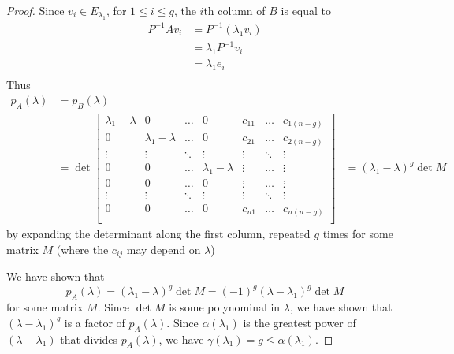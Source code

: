\documentclass{article}
\begin{document}
\begin{proof}
  Since $v_i \in E_{\lambda_1}$, for $1 \leq i \leq g$, the $i$th column of $B$ is equal to
  \begin{align*}
    P^{-1}Av_i & = P^{-1}(\lambda_1v_i) \\
               & = \lambda_1P^{-1}v_i   \\
               & = \lambda_1e_i         \\
  \end{align*}
  Thus
  \begin{align*}
    p_A(\lambda) & = p_B(\lambda)                   \\
                 & = \det
    \begin{bmatrix}
      \lambda_1 - \lambda & 0                   & \dots  & 0                   & c_{11} & \dots  & c_{1(n-g)} \\
      0                   & \lambda_1 - \lambda & \dots  & 0                   & c_{21} & \dots  & c_{2(n-g)} \\
      \vdots              & \vdots              & \ddots & \vdots              & \vdots & \ddots & \vdots     \\
      0                   & 0                   & \dots  & \lambda_1 - \lambda & \vdots & \dots  & \vdots     \\
      0                   & 0                   & \dots  & 0                   & \vdots & \dots  & \vdots     \\
      \vdots              & \vdots              & \ddots & \vdots              & \vdots & \ddots & \vdots     \\
      0                   & 0                   & \dots  & 0                   & c_{n1} & \dots  & c_{n(n-g)} \\
    \end{bmatrix}
                 & = (\lambda_1 - \lambda)^g \det M
  \end{align*}
  by expanding the determinant along the first column, repeated $g$ times for some matrix $M$ (where the $c_{ij}$ may depend on $\lambda$)

  We have shown that \[
    p_A(\lambda) = (\lambda_1 - \lambda)^g \det M = (-1)^g (\lambda - \lambda_1)^g \det M
  \]
  for some matrix $M$. Since $\det M$ is some polynominal in $\lambda$, we have shown that $(\lambda - \lambda_1)^g$ is a factor of $p_A(\lambda)$. Since $\alpha(\lambda_1)$ is the greatest power of $(\lambda - \lambda_1)$ that divides $p_A(\lambda)$, we have $\gamma(\lambda_1) = g \leq \alpha(\lambda_1)$.
\end{proof}
\end{document}
